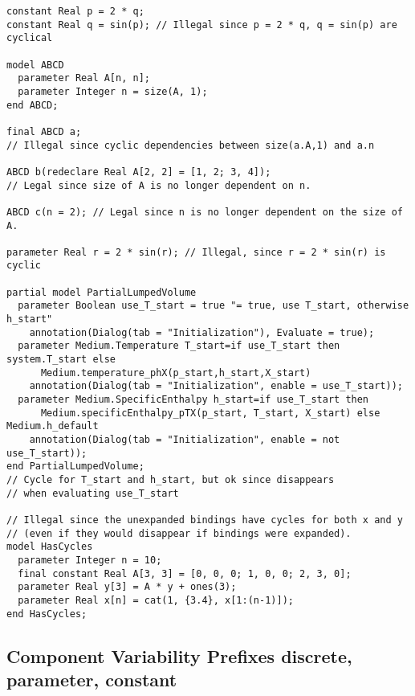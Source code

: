 \begin{example}
\begin{lstlisting}[language=modelica]
constant Real p = 2 * q;
constant Real q = sin(p); // Illegal since p = 2 * q, q = sin(p) are cyclical

model ABCD
  parameter Real A[n, n];
  parameter Integer n = size(A, 1);
end ABCD;

final ABCD a;
// Illegal since cyclic dependencies between size(a.A,1) and a.n

ABCD b(redeclare Real A[2, 2] = [1, 2; 3, 4]);
// Legal since size of A is no longer dependent on n.

ABCD c(n = 2); // Legal since n is no longer dependent on the size of A.

parameter Real r = 2 * sin(r); // Illegal, since r = 2 * sin(r) is cyclic

partial model PartialLumpedVolume
  parameter Boolean use_T_start = true "= true, use T_start, otherwise h_start"
    annotation(Dialog(tab = "Initialization"), Evaluate = true);
  parameter Medium.Temperature T_start=if use_T_start then system.T_start else
      Medium.temperature_phX(p_start,h_start,X_start)
    annotation(Dialog(tab = "Initialization", enable = use_T_start));
  parameter Medium.SpecificEnthalpy h_start=if use_T_start then
      Medium.specificEnthalpy_pTX(p_start, T_start, X_start) else Medium.h_default
    annotation(Dialog(tab = "Initialization", enable = not use_T_start));
end PartialLumpedVolume;
// Cycle for T_start and h_start, but ok since disappears
// when evaluating use_T_start

// Illegal since the unexpanded bindings have cycles for both x and y
// (even if they would disappear if bindings were expanded).
model HasCycles
  parameter Integer n = 10;
  final constant Real A[3, 3] = [0, 0, 0; 1, 0, 0; 2, 3, 0];
  parameter Real y[3] = A * y + ones(3);
  parameter Real x[n] = cat(1, {3.4}, x[1:(n-1)]);
end HasCycles;
\end{lstlisting}
\end{example}

\subsection{Component Variability Prefixes discrete, parameter, constant}\label{component-variability-prefixes-discrete-parameter-constant}

